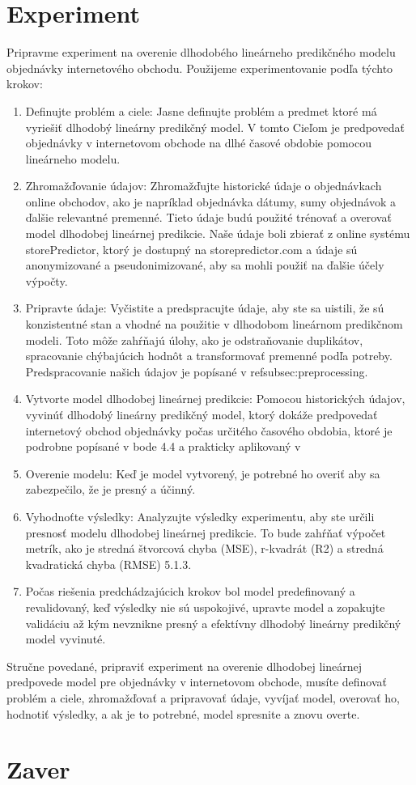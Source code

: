    \section{Experiment}
    Pripravme experiment na overenie dlhodobého lineárneho predikčného modelu objednávky internetového obchodu. Použijeme experimentovanie podľa týchto krokov:
    \begin{enumerate}
    \item Definujte problém a ciele: Jasne definujte problém a predmet ktoré má vyriešiť dlhodobý lineárny predikčný model. V tomto
    Cieľom je predpovedať objednávky v internetovom obchode na dlhé časové obdobie pomocou lineárneho modelu.
    \item  Zhromažďovanie údajov: Zhromažďujte historické údaje o objednávkach online obchodov, ako je napríklad objednávka
    dátumy, sumy objednávok a ďalšie relevantné premenné. Tieto údaje budú použité trénovať a overovať model dlhodobej lineárnej predikcie. Naše údaje boli
    zbierať z online systému storePredictor, ktorý je dostupný na storepredictor.com a údaje sú anonymizované a pseudonimizované,
    aby sa mohli použiť na ďalšie účely výpočty.
    \item  Pripravte údaje: Vyčistite a predspracujte údaje, aby ste sa uistili, že sú konzistentné stan a vhodné na použitie v dlhodobom
    lineárnom predikčnom modeli. Toto môže zahŕňajú úlohy, ako je odstraňovanie duplikátov, spracovanie chýbajúcich hodnôt a transformovať premenné
    podľa potreby. Predspracovanie našich údajov je popísané v ref{subsec:preprocessing}.
    \item  Vytvorte model dlhodobej lineárnej predikcie: Pomocou historických údajov, vyvinúť dlhodobý lineárny predikčný model,
    ktorý dokáže predpovedať internetový obchod objednávky počas určitého časového obdobia, ktoré je podrobne popísané v bode 4.4 a prakticky
    aplikovaný v 
    \item  Overenie modelu: Keď je model vytvorený, je potrebné ho overiť aby sa zabezpečilo, že je presný a účinný.
    \item Vyhodnoťte výsledky: Analyzujte výsledky experimentu, aby ste určili presnosť modelu dlhodobej lineárnej predikcie. To bude zahŕňať
    výpočet metrík, ako je stredná štvorcová chyba (MSE), r-kvadrát (R2) a stredná kvadratická chyba (RMSE) 5.1.3.
    \item Počas riešenia predchádzajúcich krokov bol model predefinovaný a revalidovaný, keď výsledky nie sú uspokojivé, upravte model a zopakujte validáciu
    až kým nevznikne presný a efektívny dlhodobý lineárny predikčný model vyvinuté.
    \end{enumerate}
    Stručne povedané, pripraviť experiment na overenie dlhodobej lineárnej predpovede model pre objednávky v internetovom obchode, musíte definovať
    problém a ciele, zhromažďovať a pripravovať údaje, vyvíjať model, overovať ho, hodnotiť výsledky, a ak je to potrebné, model spresnite a znovu overte.
    \section{Zaver}